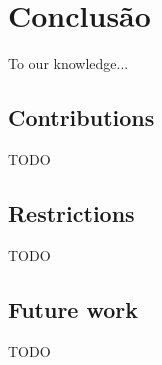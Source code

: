 \chapter{Conclusão}
\label{chap:conclusao}

To our knowledge...


\section{Contributions}

TODO


\section{Restrictions}

TODO


\section{Future work}

TODO